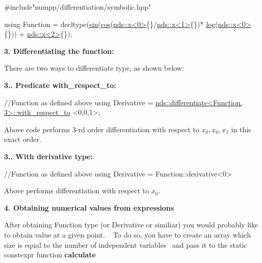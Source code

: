 \begin{DoxyCode}
\textcolor{preprocessor}{#include"numpp/differentiation/symbolic.hpp"}

\textcolor{keyword}{using} Function = decltype(\hyperlink{group__numpp__differentiation__forward__automatic_ga6f6f07250087b18ada9ea1f84418f24f}{sin}(\hyperlink{group__numpp__differentiation__forward__automatic_gaa5a06320f93037d94fda441546d7d690}{cos}(\hyperlink{classnumpp_1_1differentiation_1_1symbolic_1_1variable}{nds::x<0>}\{\}/\hyperlink{classnumpp_1_1differentiation_1_1symbolic_1_1variable}{nds::x<1>}\{\})*
      \hyperlink{group__numpp__differentiation__forward__automatic_ga0f6011595edffe756a984de60358fe5f}{log}(\hyperlink{classnumpp_1_1differentiation_1_1symbolic_1_1variable}{nds::x<0>}\{\})) + \hyperlink{classnumpp_1_1differentiation_1_1symbolic_1_1variable}{nds::x<2>}\{\});
\end{DoxyCode}


{\bfseries 3. Differentiating the function\+:}

There are two ways to differentiate type, as shown below\+:

{\bfseries 3.. Predicate with\+\_\+respect\+\_\+to\+:} 
\begin{DoxyCode}
\textcolor{comment}{//Function as defined above}
\textcolor{keyword}{using} Derivative = \hyperlink{classnumpp_1_1differentiation_1_1symbolic_1_1differentiate}{nds::differentiate<Function, 3>::with\_respect\_to}
      <0,0,1>;
\end{DoxyCode}


Above code performs 3-\/rd order differentiation with respect to $x_0, x_0, x_1 $ in this exact order.

{\bfseries 3.. With derivative type\+:} 
\begin{DoxyCode}
\textcolor{comment}{//Function as defined above}
\textcolor{keyword}{using} Derivative = Function::derivative<0>
\end{DoxyCode}


Above performs differentiation with respect to $x_0$.

{\bfseries 4. Obtaining numerical values from expressions}

After obtaining Function type (or Derivative or similiar) you would probably like to obtain value at a given point. ~\newline
To do so, you have to create an array which size is equal to the number of independent variables~\newline
and pass it to the static constexpr function {\bfseries calculate}

